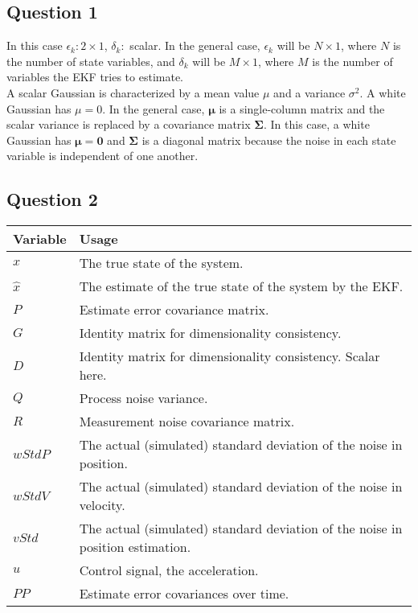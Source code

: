 \subsection{Question 1}
	In this case $\epsilon_k: 2 \times 1$, $\delta_k:$ scalar. In the general case, $\epsilon_k$ will be $N \times 1$, where $N$ is
	the number of state variables, and $\delta_k$ will be $M \times 1$, where $M$ is the number of variables the EKF tries to estimate.
	\\
	A scalar Gaussian is characterized by a mean value $\mu$ and a variance $\sigma^2$. A white Gaussian has $\mu = 0$. 
	In the general case, $\boldsymbol{\mu}$ is a single-column matrix and the scalar variance is replaced by a covariance matrix 
	$\boldsymbol{\Sigma}$. In this case, a white Gaussian has $\boldsymbol{\mu} = \boldsymbol{0}$ and $\boldsymbol{\Sigma}$ is a
	diagonal matrix because the noise in each state variable is independent of one another.
	
\subsection{Question 2}

\begin{table}[!htb]
	\centering
    \begin{tabular}{l|l}
    Variable & Usage                                                    \\ \hline
    $x$        & The true state of the system.							  \\
    $\hat{x}$  & The estimate of the true state of the system by the EKF.\\
    $P$        & Estimate error covariance matrix.                       \\
    $G$        & Identity matrix for dimensionality consistency.          \\
    $D$        & Identity matrix for dimensionality consistency. Scalar here. \\
    $Q$        & Process noise variance.          \\
    $R$        & Measurement noise covariance matrix.                    \\
    $wStdP$    & The actual (simulated) standard deviation of the noise in position.            \\
    $wStdV$    & The actual (simulated) standard deviation of the noise in velocity.            \\
    $vStd$     & The actual (simulated) standard deviation of the noise in position estimation. \\
    $u$        & Control signal, the acceleration.                       \\
    $PP$       & Estimate error covariances over time.                              \\
    \end{tabular}
\end{table}